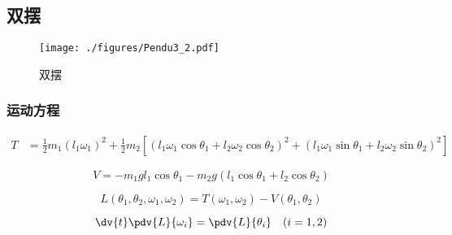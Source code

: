 

\subsection{双摆}
\begin{figure}[ht]
\centering
\texttt{[image: ./figures/Pendu3\_2.pdf]}
\caption{双摆} \label{Pendu3_fig2}
\end{figure}

\subsubsection{运动方程}
\begin{equation}
\begin{aligned}
T &= \frac{1}{2} m_1 (l_1 \omega_1)^2 + \frac{1}{2} m_2 [(l_1 \omega_1 \cos\theta_1 + l_2 \omega_2 \cos\theta_2)^2 + (l_1 \omega_1 \sin\theta_1 + l_2 \omega_2 \sin\theta_2)^2]
\end{aligned}
\end{equation}

\begin{equation}  
V = -m_1 g l_1 \cos \theta_1 - m_2 g (l_1\cos \theta_1 + l_2 \cos \theta_2)
\end{equation}

\begin{equation}
L(\theta_1, \theta_2, \omega_1, \omega_2) = T(\omega_1, \omega_2) - V(\theta_1, \theta_2)
\end{equation}

\begin{equation}\label{Pendu3_eq1}
\dv{t}\pdv{L}{\omega_i} = \pdv{L}{\theta_i} \quad (i=1,2)
\end{equation}

